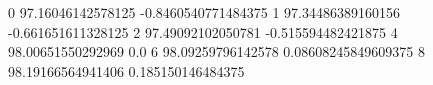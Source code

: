 0 97.16046142578125 -0.8460540771484375
1 97.34486389160156 -0.661651611328125
2 97.49092102050781 -0.515594482421875
4 98.00651550292969 0.0
6 98.09259796142578 0.08608245849609375
8 98.19166564941406 0.185150146484375
